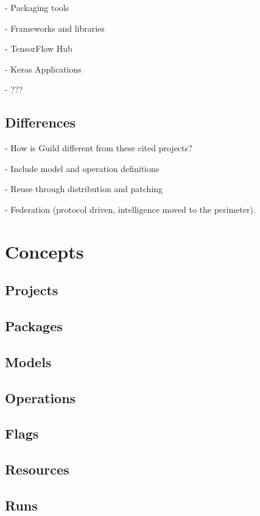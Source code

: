 \documentclass{article}
\begin{document}
- Packaging tools

- Frameworks and libraries

- TensorFlow Hub

- Keras Applications

- ???

\subsection{Differences}

- How is Guild different from these cited projects?

- Include model and operation definitions

- Reuse through distribution and patching

- Federation (protocol driven, intelligence moved to the perimeter).

\section{Concepts}

\subsection{Projects}

\subsection{Packages}

\subsection{Models}

\subsection{Operations}

\subsection{Flags}

\subsection{Resources}

\subsection{Runs}
\end{document}
